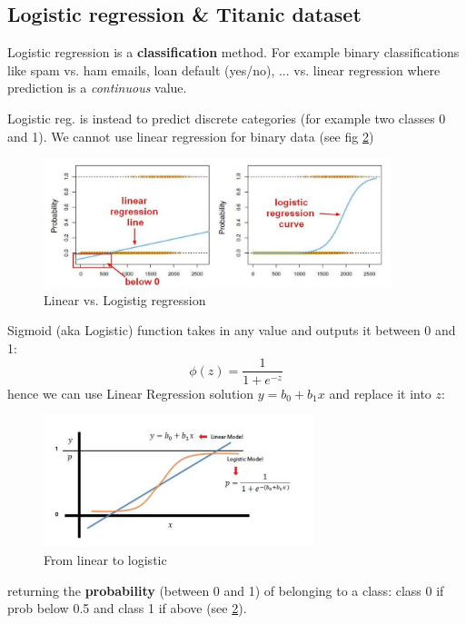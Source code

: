 \documentclass[12pt]{article}
\begin{document}
\subsection{Logistic regression \& Titanic dataset}
Logistic regression is a \textbf{classification} method. For example binary classifications like spam vs. ham emails, loan default (yes/no), ... 
vs. linear regression where prediction is a \textit{continuous} value. 

Logistic reg. is instead to predict discrete categories (for example two classes 0 and 1). We cannot use linear regression for binary data (see fig \ref{lin_log_regr})


\begin{figure}[htbp] 
	\centering
	\includegraphics[width=0.9\textwidth]{pics/logistic_regression}
	\caption{Linear vs. Logistig regression} 
	\label{lin_log_regr}
\end{figure}

Sigmoid (aka Logistic) function takes in any value and outputs it between 0 and 1:
\[ \phi(z) = \frac{1}{1+e^{-z}}
\]
hence we can use Linear Regression solution $y=b_0+b_1 x$ and replace it into $z$: 
\begin{figure}[htbp] 
	\centering
	\includegraphics[width=0.7\textwidth]{pics/sigmoid}
	\caption{From linear to logistic}  
	\label{lin_log_regr}
\end{figure}
returning the \textbf{probability} (between 0 and 1) of belonging to a class: class 0 if prob below 0.5 and class 1 if above (see \ref{lin_log_regr}). 
\end{document}
